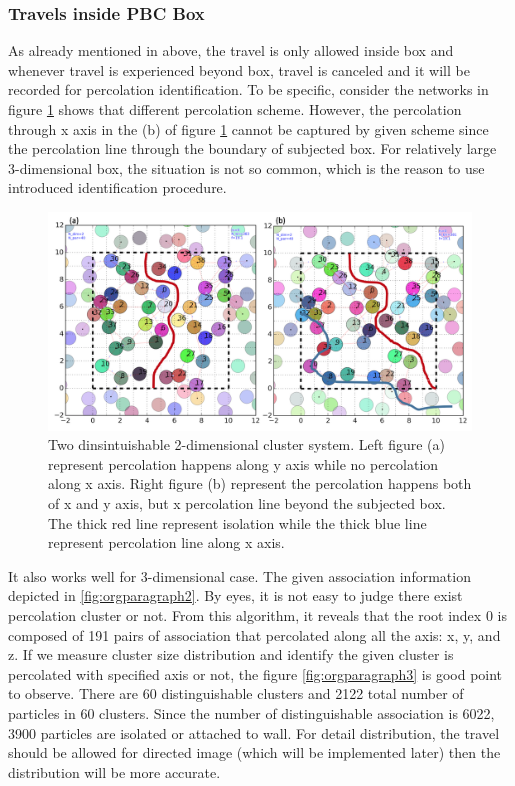 \documentclass[10pt, a4paper]{article}
\begin{document}
\begin{appendices}
\subsubsection{Travels inside PBC Box}
\label{sec:orgheadline9}
As already mentioned in above, the travel is only allowed inside box and whenever travel is experienced beyond box, travel is canceled and it will be recorded for percolation identification. To be specific, consider the networks in figure \ref{fig:orgparagraph1} shows that different percolation scheme. However, the percolation through x axis in the (b) of figure \ref{fig:orgparagraph1} cannot be captured by given scheme since the percolation line through the boundary of subjected box. For relatively large 3-dimensional box, the situation is not so common, which is the reason to use introduced identification procedure. 

\begin{figure}
\centering
\includegraphics[width=.9\linewidth]{../data_structure/ex_percolation_identification.png}
\caption{
  Two dinsintuishable 2-dimensional cluster system. Left figure (a) represent percolation happens along y axis while no percolation along x axis. Right figure (b) represent the percolation happens both of x and y axis, but x percolation line beyond the subjected box. The thick red line represent isolation while the thick blue line represent percolation line along x axis.}
\label{fig:orgparagraph1}
\end{figure}

It also works well for 3-dimensional case. The given association information depicted in \ref{fig:orgparagraph2}. By eyes, it is not easy to judge there exist percolation cluster or not. From this algorithm, it reveals that the root index 0 is composed of 191 pairs of association that percolated along all the axis: x, y, and z. If we measure cluster size distribution and identify the given cluster is percolated with specified axis or not, the figure \ref{fig:orgparagraph3} is good point to observe. There are 60 distinguishable clusters and 2122 total number of particles in 60 clusters. Since the number of distinguishable association is 6022, 3900 particles are isolated or attached to wall. For detail distribution, the travel should be allowed for directed image (which will be implemented later) then the distribution will be more accurate.


\end{appendices}
\end{document}
